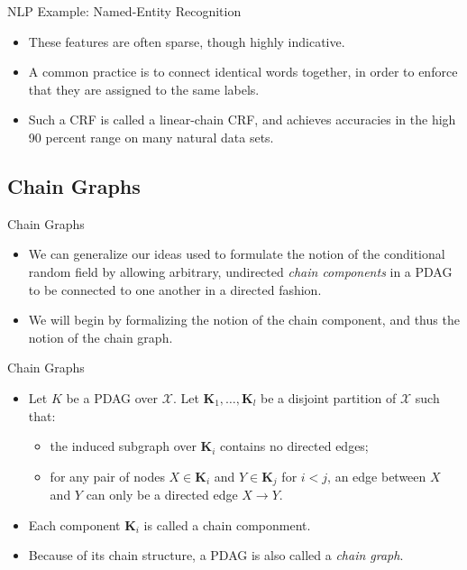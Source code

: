 \documentclass[11pt]{beamer}
\begin{document}
\begin{frame}{NLP Example: Named-Entity Recognition \cite{pgmslides}}
\setlength{\topsep}{0pt}
\setlength{\partopsep}{0pt}
\centering
\resizebox{0.8\textwidth}{!}{\nerexample}
\begin{itemize}
	\item These features are often sparse, though highly indicative.
	\item A common practice is to connect identical words together, in order
	to enforce that they are assigned to the same labels.
	\item Such a CRF is called a linear-chain CRF, and achieves accuracies
	in the high 90 percent range on many natural data sets.
\end{itemize}
\end{frame}

\subsection{Chain Graphs}

\begin{frame}{Chain Graphs}
\begin{itemize}
	\item We can generalize our ideas used to formulate the notion of the
	conditional random field by allowing arbitrary, undirected \emph{chain
	components} in a PDAG to be connected to one another in a directed
	fashion.
	\item We will begin by formalizing the notion of the chain component,
	and thus the notion of the chain graph.
\end{itemize}
\end{frame}

\begin{frame}{Chain Graphs}
\begin{itemize}
	\item Let $K$ be a PDAG over $\mathcal{X}$. Let $\boldsymbol{K}_{1},
	\ldots, \boldsymbol{K}_{l}$ be a disjoint partition of $\mathcal{X}$
	such that:
	\begin{itemize}
		\item the induced subgraph over $\boldsymbol{K}_{i}$ contains no
		directed edges;
		\item for any pair of nodes $X \in \boldsymbol{K}_{i}$ and $Y
		\in \boldsymbol{K}_{j}$ for $i < j$, an edge between $X$ and $Y$
		can only be a directed edge $X \rightarrow Y$.
	\end{itemize}
	\item Each component $\boldsymbol{K}_{i}$ is called a chain componment.
	\item Because of its chain structure, a PDAG is also called a
	\emph{chain graph}.
\end{itemize}
\end{frame}
\end{document}
